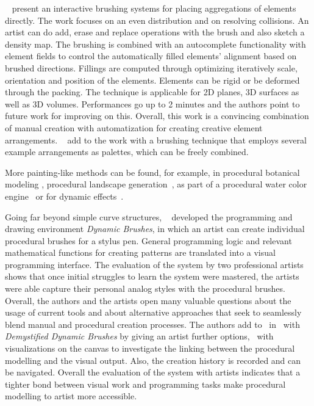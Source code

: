  \citeauthor*{hsu_2020_aef}~\cite{hsu_2020_aef} present an interactive brushing systems for placing aggregations of elements directly. The work focuses on an even distribution and on resolving collisions. An artist can do add, erase and replace operations with the brush and also sketch a density map. The brushing is combined with an autocomplete functionality with element fields to control the automatically filled elements' alignment based on brushed directions. Fillings are computed through optimizing iteratively scale, orientation and position of the elements. Elements can be rigid or be deformed through the packing. The technique is applicable for 2D planes, 3D surfaces as well as 3D volumes. Performances go up to 2 minutes and the authors point to future work for improving on this. Overall, this work is a convincing combination of manual creation with automatization for creating creative element arrangements. \citeauthor*{davison_2019_ief}~\cite{davison_2019_ief} add to the work with a brushing technique that employs several example arrangements as palettes, which can be freely combined. 

More painting-like methods can be found, for example, in procedural botanical modeling \cite{anastacio_2008_spl,chen_2008_stm,palubicki_2009_sot}, procedural landscape generation~\cite{emilien_2015_wie}, as part of a procedural water color engine~\cite{diverdi_2013_ppp} or for dynamic effects~\cite{xing_2016_eit}. 

Going far beyond simple curve structures, \citeauthor*{jacobs_2018_dbe}~\cite{jacobs_2018_dbe} developed the programming and drawing environment \textit{Dynamic Brushes}, in which an artist can create individual procedural brushes for a stylus pen. General programming logic and relevant mathematical functions for creating patterns are translated into a visual programming interface. The evaluation of the system by two professional artists shows that once initial struggles to learn the system were mastered, the artists were able capture their personal analog styles with the procedural brushes. Overall, the authors and the artists open many valuable questions about the usage of current tools and about alternative approaches that seek to seamlessly blend manual and procedural creation processes. The authors add to~\cite{jacobs_2018_dbe} in~\cite{li_2020_sva} with \textit{Demystified Dynamic Brushes} by giving an artist further options, \eg~with visualizations on the canvas to investigate the linking between the procedural modelling and the visual output. Also, the creation history is recorded and can be navigated. Overall the evaluation of the system with artists indicates that a tighter bond between visual work and programming tasks make procedural modelling to artist more accessible.

